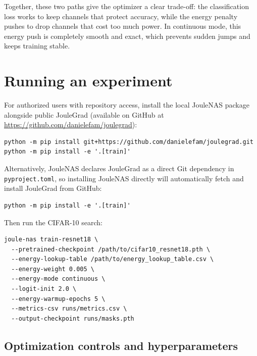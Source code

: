 Together, these two paths give the optimizer a clear trade-off: the classification loss works to keep channels that protect accuracy, while the energy penalty pushes to drop channels that cost too much power. In continuous mode, this energy push is completely smooth and exact, which prevents sudden jumps and keeps training stable.

\section{Running an experiment}

For authorized users with repository access, install the local JouleNAS package alongside public JouleGrad (available on GitHub at \url{https://github.com/danielefam/joulegrad}):

\begin{lstlisting}
python -m pip install git+https://github.com/danielefam/joulegrad.git
python -m pip install -e '.[train]'
\end{lstlisting}

Alternatively, JouleNAS declares JouleGrad as a direct Git dependency in \texttt{pyproject.toml}, so installing JouleNAS directly will automatically fetch and install JouleGrad from GitHub:

\begin{lstlisting}
python -m pip install -e '.[train]'
\end{lstlisting}

Then run the CIFAR-10 search:

\begin{lstlisting}
joule-nas train-resnet18 \
  --pretrained-checkpoint /path/to/cifar10_resnet18.pth \
  --energy-lookup-table /path/to/energy_lookup_table.csv \
  --energy-weight 0.005 \
  --energy-mode continuous \
  --logit-init 2.0 \
  --energy-warmup-epochs 5 \
  --metrics-csv runs/metrics.csv \
  --output-checkpoint runs/masks.pth
\end{lstlisting}

\subsection{Optimization controls and hyperparameters}

